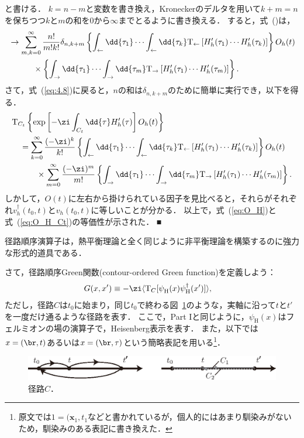 \documentclass[a4paper,10pt]{jsarticle}
\newcommand{\mH}{\mathrm{H}}
\begin{document}
と書ける．
$k = n - m$と変数を書き換え，Kroneckerのデルタを用いて$k + m = n$を保ちつつ$k$と$m$の和を$0$から$\infty$までとるように書き換える．
すると，式~(\label{eq:4.11})は，
\begin{align}
& \to \sum_{m, k = 0}^{\infty} \frac{n!}{m! k!} \delta_{n, k + m}
	\left\{
		\int_{\leftarrow} \dd{\tau_1} \cdots \int_{\leftarrow} \dd{\tau_k} \mathrm{T}_{\leftarrow} \left[ H'_h (\tau_1) \cdots H'_h (\tau_k) \right]
	\right\}
	O_h (t)
\notag \\ & \hspace{3em} \times
	\left\{
		\int_{\rightarrow} \dd{\tau_1} \cdots \int_{\rightarrow} \dd{\tau_m} \mathrm{T}_{\rightarrow} \left[ H'_h (\tau_1) \cdots H'_h (\tau_m) \right]
	\right\}
.\end{align}
さて，式~(\ref{eq:4.8})に戻ると，$n$の和は$\delta_{n, k+m}$のために簡単に実行でき，以下を得る．
\begin{align}
& \mathrm{T}_{C_t} \left\{ \exp \left[ - \zi \int_{C_t} \dd{\tau} H'_h (\tau) \right] O_h (t) \right\}
\notag \\ & \hspace{1em}
	= \sum_{k = 0}^{\infty} \frac{(-\zi)^k}{k!}
	\left\{
		\int_{\leftarrow} \dd{\tau_1} \cdots \int_{\leftarrow} \dd{\tau_k} \mathrm{T}_{\leftarrow} \left[ H'_h (\tau_1) \cdots H'_h (\tau_k) \right]
	\right\}
	O_h (t)
\notag \\ & \hspace{3em} \times
	\sum_{m = 0}^{\infty} \frac{(-\zi)^m}{m!}
	\left\{
		\int_{\rightarrow} \dd{\tau_1} \cdots \int_{\rightarrow} \dd{\tau_m} \mathrm{T}_{\rightarrow} \left[ H'_h (\tau_1) \cdots H'_h (\tau_m) \right]
	\right\}
.\end{align}
しかして，$O (t)$に左右から掛けられている因子を見比べると，それらがそれぞれ$v_h^{\dagger} (t_0, t)$と$v_h (t_0, t)$に等しいことが分かる．
以上で，式~(\ref{eq:O_H})と式~(\ref{eq:O_H_Ct})の等価性が示された．
■

径路順序演算子は，熱平衡理論と全く同じように非平衡理論を構築するのに強力な形式的道具である．

さて，径路順序Green関数(contour-ordered Green function)を定義しよう：
\begin{align}
G (x, x')
	& \equiv - \zi \langle \mathrm{T}_C [ \psi^{}_{\mH} (x) \psi^{\dagger}_{\mH} (x') ] \rangle
\label{def:G}
,\end{align}
ただし，径路$C$は$t_0$に始まり，同じ$t_0$で終わる図~\ref{fig:4.2}のような，実軸に沿って$t$と$t'$を一度だけ通るような径路を表す．
ここで，Part Iと同じように，$\psi_{\mH} (x)$はフェルミオンの場の演算子で，Heisenberg表示を表す．
また，以下では$x = (\br, t)$あるいは$x = (\br, \tau)$という簡略表記を用いる\footnote{原文では$1 = (\bm{x}_1, t_1$などと書かれているが，個人的にはあまり馴染みがないため，馴染みのある表記に書き換えた．}．
\begin{figure}[thbp]
\centering
\includegraphics[width=\linewidth]{4.2.eps}
\caption{\label{fig:4.2}径路$C$．}
\end{figure}
\end{document}
